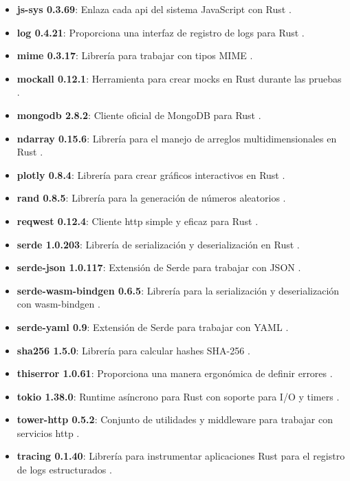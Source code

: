\begin{itemize}
\begin{itemize}
    \item \textbf{js-sys 0.3.69}: Enlaza cada \ac{api} del sistema JavaScript con Rust \cite{js_sys}.
    \item \textbf{log 0.4.21}: Proporciona una interfaz de registro de logs para Rust \cite{log}.
    \item \textbf{mime 0.3.17}: Librería para trabajar con tipos MIME \cite{mime}.
    \item \textbf{mockall 0.12.1}: Herramienta para crear mocks en Rust durante las pruebas \cite{mockall}.
    \item \textbf{mongodb 2.8.2}: Cliente oficial de MongoDB para Rust \cite{mongodb_crate}.
    \item \textbf{ndarray 0.15.6}: Librería para el manejo de arreglos multidimensionales en Rust \cite{ndarray}.
    \item \textbf{plotly 0.8.4}: Librería para crear gráficos interactivos en Rust \cite{plotly}.
    \item \textbf{rand 0.8.5}: Librería para la generación de números aleatorios \cite{rand}.
    \item \textbf{reqwest 0.12.4}: Cliente \ac{http} simple y eficaz para Rust \cite{reqwest}.
    \item \textbf{serde 1.0.203}: Librería de serialización y deserialización en Rust \cite{serde}.
    \item \textbf{serde-json 1.0.117}: Extensión de Serde para trabajar con JSON \cite{serde_json}.
    \item \textbf{serde-wasm-bindgen 0.6.5}: Librería para la serialización y deserialización con wasm-bindgen \cite{serde_wasm_bindgen}.
    \item \textbf{serde-yaml 0.9}: Extensión de Serde para trabajar con YAML \cite{serde_yaml}.
    \item \textbf{sha256 1.5.0}: Librería para calcular hashes SHA-256 \cite{sha256}.
    \item \textbf{thiserror 1.0.61}: Proporciona una manera ergonómica de definir errores \cite{thiserror}.
    \item \textbf{tokio 1.38.0}: Runtime asíncrono para Rust con soporte para I/O y timers \cite{tokio}.
    \item \textbf{tower-http 0.5.2}: Conjunto de utilidades y middleware para trabajar con servicios \ac{http} \cite{tower_http}.
    \item \textbf{tracing 0.1.40}: Librería para instrumentar aplicaciones Rust para el registro de logs estructurados \cite{tracing}.

\end{itemize}
\end{itemize}
